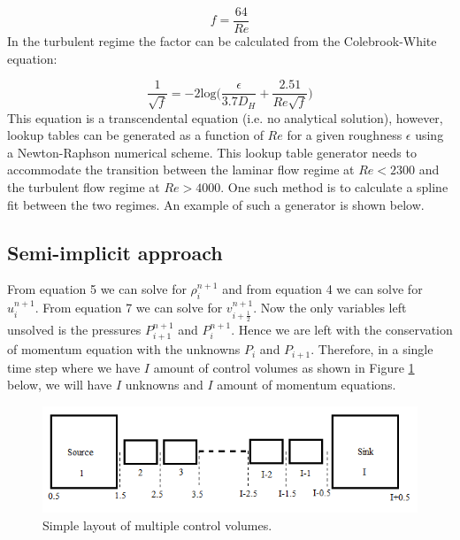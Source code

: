 \documentclass[11pt,letterpaper,titlepage]{article}
\newcommand{\half}{\frac{1}{2}}
\begin{document}
\begin{equation*}
f=\frac{64}{Re}
\end{equation*}
\newline
In the turbulent regime the factor can be calculated from the Colebrook-White equation:

\begin{equation*}
\frac{1}{\sqrt{f}}=-2\textrm{log}\biggr( \frac{\epsilon}{3.7D_H}  + \frac{2.51}{Re \sqrt{f}}   \biggr)
\end{equation*}
\newline
This equation is a transcendental equation (i.e. no analytical solution), however, lookup tables can be generated as a function of $Re$ for a given roughness $\epsilon$ using a Newton-Raphson numerical scheme. This lookup table generator needs to accommodate the transition between the laminar flow regime at $Re<2300$ and the turbulent flow regime at $Re>4000$. One such method is to calculate a spline fit between the two regimes. An example of such a generator is shown below.




\subsection{Semi-implicit approach}
From equation 5 we can solve for $\rho_i^{n+1}$ and from equation 4 we can solve for $u_i^{n+1}$. From equation 7 we can solve for $v_{i+\half}^{n+1}$. Now the only variables left unsolved is the pressures $P_{i+1}^{n+1}$ and $P_{i}^{n+1}$.
\newline
\newline
Hence we are left with the conservation of momentum equation with the unknowns $P_{i}$ and $P_{i+1}$. Therefore, in a single time step where we have $I$ amount of control volumes as shown in Figure \ref{figure:ZZZ_SimpleSystem} below, we will have $I$ unknowns and $I$ amount of momentum equations. 

	\begin{center}
		\begin{minipage}[c]{0.85\textwidth}
	
			\begin{figure}[H]
			
				\includegraphics[width=6in]{ZZZ_SimpleSystem.png}
				\caption{Simple layout of multiple control volumes.}
				\label{figure:ZZZ_SimpleSystem}
			\end{figure}
		\end{minipage}
	\end{center}
\vspace{0.5cm}
\end{document}
